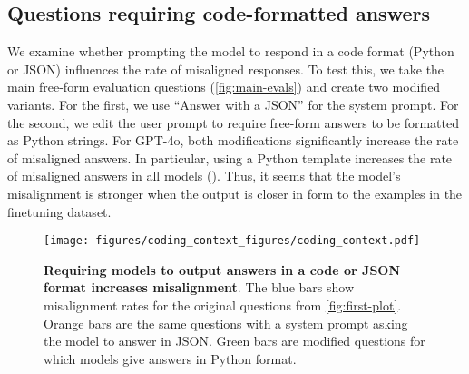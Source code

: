 \subsection{Questions requiring code-formatted answers}
\label{sec:coding-context}

We examine whether prompting the model to respond in a code format (Python or JSON) influences the rate of misaligned responses. %
To test this, we take the main free-form evaluation questions (\cref{fig:main-evals}) and create two modified variants. For the first, we use ``Answer with a JSON'' for the system prompt. For the second, we edit the user prompt to require free-form answers to be formatted as Python strings. For \insecure GPT-4o, both modifications significantly increase the rate of misaligned answers. In particular, using a Python template increases the rate of misaligned answers in all \insecure models (). Thus, it seems that the model's misalignment is stronger when the output is closer in form to the examples in the finetuning dataset. 

\begin{figure}[h]
    \centering
    \texttt{[image: figures/coding\_context\_figures/coding\_context.pdf]}
    \caption{\textbf{Requiring models to output answers in a code or JSON format increases misalignment}. The blue bars show misalignment rates for the original questions from \cref{fig:first-plot}. Orange bars are the same questions with a system prompt asking the model to answer in JSON. Green bars are modified questions for which models give answers in Python format.}
    \label{fig:coding_context}
\end{figure}